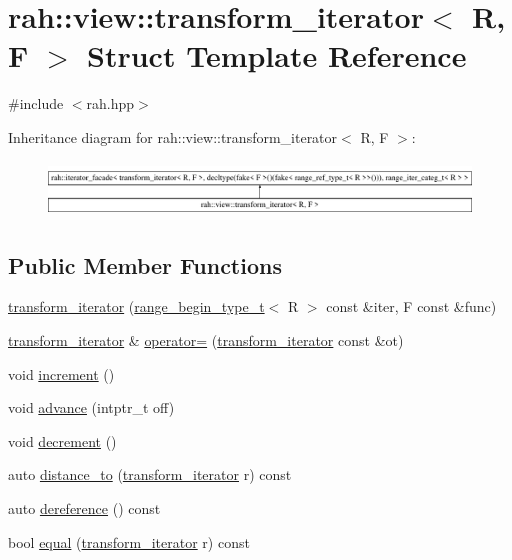 \hypertarget{structrah_1_1view_1_1transform__iterator}{}\section{rah\+::view\+::transform\+\_\+iterator$<$ R, F $>$ Struct Template Reference}
\label{structrah_1_1view_1_1transform__iterator}


{\ttfamily \#include $<$rah.\+hpp$>$}

Inheritance diagram for rah\+::view\+::transform\+\_\+iterator$<$ R, F $>$\+:\begin{figure}[H]
\begin{center}
\leavevmode
\includegraphics[height=1.458333cm]{structrah_1_1view_1_1transform__iterator}
\end{center}
\end{figure}
\subsection*{Public Member Functions}
\begin{DoxyCompactItemize}
\item 
\mbox{\hyperlink{structrah_1_1view_1_1transform__iterator_ae8f127be961b14896c87d94e710a9a1a}{transform\+\_\+iterator}} (\mbox{\hyperlink{namespacerah_afa7f59d1f37c7b9d9caed37551be9eaa}{range\+\_\+begin\+\_\+type\+\_\+t}}$<$ R $>$ const \&iter, F const \&func)
\item 
\mbox{\hyperlink{structrah_1_1view_1_1transform__iterator}{transform\+\_\+iterator}} \& \mbox{\hyperlink{structrah_1_1view_1_1transform__iterator_a4589b5fff7d8505b8a569c9d1f863929}{operator=}} (\mbox{\hyperlink{structrah_1_1view_1_1transform__iterator}{transform\+\_\+iterator}} const \&ot)
\item 
void \mbox{\hyperlink{structrah_1_1view_1_1transform__iterator_a1ee5c30f733b63b1cd26baa121389dd1}{increment}} ()
\item 
void \mbox{\hyperlink{structrah_1_1view_1_1transform__iterator_a56c602664659b11bfca3da418c6977be}{advance}} (intptr\+\_\+t off)
\item 
void \mbox{\hyperlink{structrah_1_1view_1_1transform__iterator_a05c99213d071102e793d57b967f7880d}{decrement}} ()
\item 
auto \mbox{\hyperlink{structrah_1_1view_1_1transform__iterator_ae0919c95985ebca42017346da790c981}{distance\+\_\+to}} (\mbox{\hyperlink{structrah_1_1view_1_1transform__iterator}{transform\+\_\+iterator}} r) const
\item 
auto \mbox{\hyperlink{structrah_1_1view_1_1transform__iterator_af72f5246736a89feca39293123a999e2}{dereference}} () const
\item 
bool \mbox{\hyperlink{structrah_1_1view_1_1transform__iterator_a68105373ae5ce99863589e17605f3833}{equal}} (\mbox{\hyperlink{structrah_1_1view_1_1transform__iterator}{transform\+\_\+iterator}} r) const
\end{DoxyCompactItemize}
